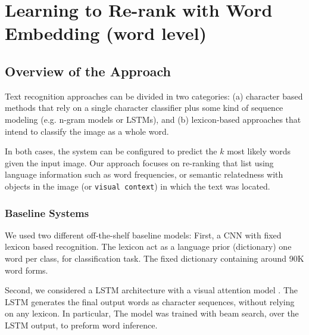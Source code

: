 \documentclass[phd,tocprelim]{cornell}
\begin{document}



\chapter{Learning to Re-rank with Word Embedding (word level)}




\section{Overview of the Approach}


Text recognition approaches can be divided in two categories: (a) character based methods that rely on a single character classifier plus some kind of sequence modeling (e.g. n-gram models or LSTMs), and (b) lexicon-based approaches that intend to classify the image as a whole word. 

In both cases, the system can be configured to predict the $k$ most likely words given the input image. Our approach focuses on re-ranking that list using language information such as word frequencies, or semantic relatedness with objects in the image (or \texttt{visual context}) in which the text was located.
\subsection{Baseline Systems}
\label{sec:baselinesystems}
We used two different  off-the-shelf baseline models: First, a CNN \cite{jaderberg2016reading} with fixed lexicon based recognition. The lexicon act as a language prior (dictionary) one word per class, for classification task. The fixed dictionary containing around 90K word forms. 

Second, we considered a LSTM architecture with a visual attention model \cite{ghosh2017visual}. The LSTM generates the final output words as character sequences, without relying on any lexicon. In particular, The model was trained with beam search, over the LSTM output, to preform word inference.   
\end{document}
